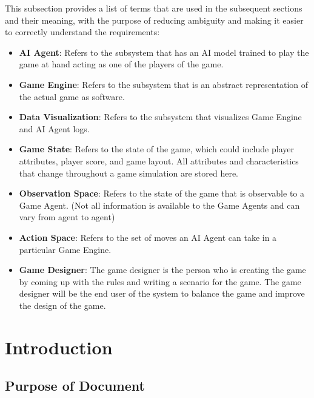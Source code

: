 \documentclass[12pt]{article}
\begin{document}
This subsection provides a list of terms that are used in the subsequent
sections and their meaning, with the purpose of reducing ambiguity and making it
easier to correctly understand the requirements:

\begin{itemize}

\item \textbf{AI Agent}: Refers to the subsystem that has an AI model trained to play the game at hand acting as one of the players of the game.

\item \textbf{Game Engine}: Refers to the subsystem that is an abstract representation of the actual game as software.

\item \textbf{Data Visualization}: Refers to the subsystem that visualizes Game Engine and AI Agent logs.

\item \textbf{Game State}: Refers to the state of the game, which could include player attributes, player score, and game layout. All attributes and characteristics that change throughout a game simulation are stored here.

\item \textbf{Observation Space}: Refers to the state of the game that is observable to a Game Agent. (Not all information is available to the Game Agents and can vary from agent to agent)

\item \textbf{Action Space}: Refers to the set of moves an AI Agent can take in a particular Game Engine.

\item \textbf{Game Designer}: The game designer is the person who is creating the game by coming up with the rules and writing a scenario for the game. The game designer will be the end user of the system to balance the game and improve the design of the game.

\end{itemize}

\newpage

\section{Introduction}
\subsection{Purpose of Document}
\end{document}
